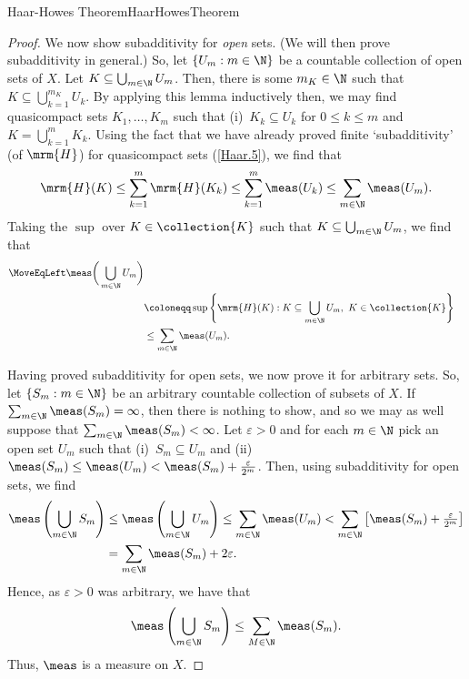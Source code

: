 \begin{thm}{Haar-Howes Theorem}{HaarHowesTheorem}
\begin{proof}
We now show subadditivity for \emph{open} sets.  (We will then prove subadditivity in general.)  So, let $\{ U_m:m\in \N \}$ be a countable collection of open sets of $X$.  Let $K\subseteq \bigcup _{m\in \N}U_m$.  Then, there is some $m_K\in \N$ such that $K\subseteq \bigcup _{k=1}^{m_K}U_k$.  By applying this lemma inductively then, we may find quasicompact sets $K_1,\ldots ,K_m$ such that (i)~$K_k\subseteq U_k$ for $0\leq k\leq m$ and $K=\bigcup _{k=1}^mK_k$.  Using the fact that we have already proved finite `subadditivity' (of $\mrm{H}$) for quasicompact sets (\cref{Haar.5}), we find that
\begin{equation}
\mrm{H}(K)\leq \sum _{k=1}^m\mrm{H}(K_k)\leq \sum _{k=1}^m\meas (U_k)\leq \sum _{m\in \N}\meas (U_m).
\end{equation}
Taking the $\sup$ over $K\in \collection{K}$ such that $K\subseteq \bigcup _{m\in \N}U_m$, we find that
\begin{equation}
\begin{split}
\MoveEqLeft
\meas \bigg( \bigcup _{m\in \N}U_m\bigg) \\
& \coloneqq \sup \left\{ \mrm{H}(K):K\subseteq \bigcup _{m\in \N}U_m,\ K\in \collection{K}\right\} \\
& \leq \sum _{m\in \N}\meas (U_m).
\end{split}
\end{equation}

Having proved subadditivity for open sets, we now prove it for arbitrary sets.  So, let $\{ S_m:m\in \N \}$ be an arbitrary countable collection of subsets of $X$.  If $\sum _{m\in \N}\meas (S_m)=\infty$, then there is nothing to show, and so we may as well suppose that $\sum _{m\in \N}\meas (S_m)<\infty$.  Let $\varepsilon >0$ and for each $m\in \N$ pick an open set $U_m$ such that (i)~$S_m\subseteq U_m$ and (ii)~$\meas (S_m)\leq \meas (U_m)<\meas (S_m)+\frac{\varepsilon}{2^m}$.  Then, using subadditivity for open sets, we find
\begin{equation}
\begin{split}
\meas \left( \bigcup _{m\in \N}S_m\right) & \leq \meas \left( \bigcup _{m\in \N}U_m\right) \leq \sum _{m\in \N}\meas (U_m)<\sum _{m\in \N}\left[ \meas (S_m)+\tfrac{\varepsilon}{2^m}\right] \\
& =\sum _{m\in \N}\meas (S_m)+2\varepsilon .
\end{split}
\end{equation}
Hence, as $\varepsilon >0$ was arbitrary, we have that
\begin{equation}
\meas \left( \bigcup _{m\in \N}S_m\right) \leq \sum _{M\in \N}\meas (S_m).
\end{equation}
Thus, $\meas$ is a measure on $X$.


\end{proof}
\end{thm}
